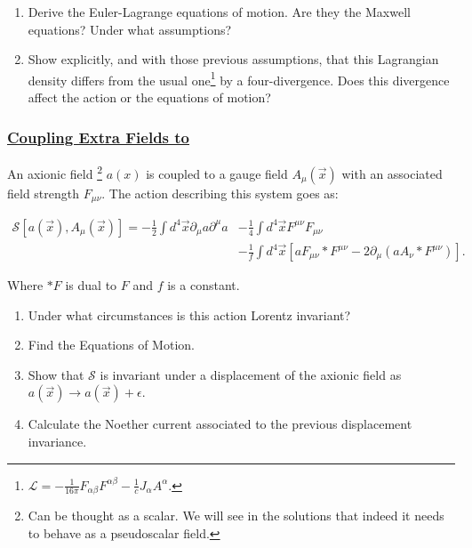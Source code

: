\begin{enumerate}
	\item Derive the Euler-Lagrange equations of motion. Are they the Maxwell equations? Under what assumptions?
	\item Show explicitly, and with those previous assumptions, that this Lagrangian density differs from the usual one\footnote{$\mathcal{L}= -\frac{1}{16\pi} F_{\alpha\beta}F^{\alpha\beta} - \frac{1}{c}J_{\alpha}A^{\alpha}.$} by a four-divergence. Does this divergence affect the action or the equations of motion?
\end{enumerate}

\subsubsection{\hyperref[Coupling Extra Fields to amu]{Coupling Extra Fields to }}

An axionic field \footnote{Can be thought as a scalar. We will see in the solutions that indeed it needs to behave as a pseudoscalar field.} $a(x)$ is coupled to a gauge field $A_{\mu}(\vec{x})$ with an associated field strength $F_{\mu \nu}$. The action describing this system goes as:

\begin{equation}\label{axionicaction}
	\begin{split}
		\mathcal{S}[a(\vec{x}),A_{\mu}(\vec{x})]=
	-\frac{1}{2}\int d^{4}\vec{x}\partial_{\mu}a \partial^{\mu}a  &- \frac{1}{4}\int d^{4}\vec{x}F^{\mu\nu}F_{\mu\nu}\\
	 &- \frac{1}{f}\int d^{4}\vec{x}\left[a F_{\mu\nu}*F^{\mu\nu} - 2 \partial_{\mu}\left(a A_{\nu}*F^{\mu\nu}\right)\right].
	\end{split}
\end{equation}

Where $*F$ is dual to $F$ and $f$ is a constant.

\begin{enumerate}
	\item Under what circumstances is this action Lorentz invariant?
	\item Find the Equations of Motion.
	\item Show that $\mathcal{S}$ is invariant under a displacement of the axionic field as $a(\vec{x})\rightarrow a(\vec{x})+ \epsilon$.
	\item Calculate the Noether current associated to the previous displacement invariance.
\end{enumerate}

